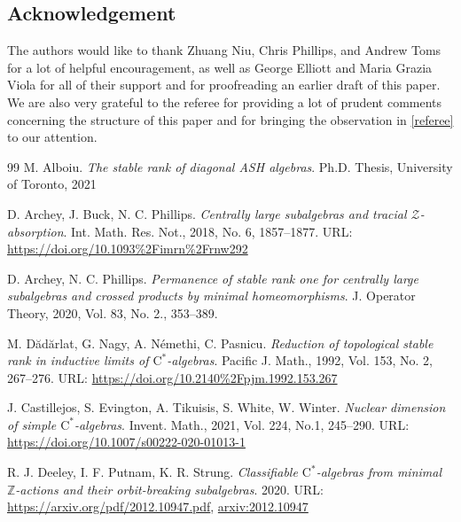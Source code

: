 \documentclass[12pt]{amsart}
\numberwithin{equation}{section}
\theoremstyle{definition}
\theoremstyle{remark}
\begin{document}
\subsection*{Acknowledgement}
The authors would like to thank Zhuang Niu, Chris Phillips, and Andrew Toms for a lot of helpful encouragement, as well as George Elliott and Maria Grazia Viola for all of their support and for proofreading an earlier draft of this paper. We are also very grateful to the referee for providing a lot of prudent comments concerning the structure of this paper and for bringing the observation in \autoref{referee} to our attention.



\begin{thebibliography}{99} 
 M. Alboiu. \textit{The stable rank of diagonal ASH algebras}. Ph.D. Thesis, University of Toronto, 2021

 D. Archey, J. Buck, N. C. Phillips. \textit{Centrally large subalgebras and tracial $\mathcal{Z}$-absorption}. Int. Math. Res. Not., 2018, No. 6, 1857--1877. URL: \href{https://doi.org/10.1093\%2Fimrn\%2Frnw292}{https://doi.org/10.1093\%2Fimrn\%2Frnw292}
	
 D. Archey, N. C. Phillips. \textit{Permanence of stable rank one for centrally large subalgebras and crossed products by minimal homeomorphisms}. J. Operator Theory, 2020, Vol. 83, No. 2., 353--389.%
	
 M. D\u{a}d\u{a}rlat, G. Nagy, A. N\'{e}methi, C. Pasnicu. \textit{Reduction of topological stable rank in inductive limits of $\mathrm{C}^*$-algebras}. Pacific J. Math., 1992, Vol. 153, No. 2, 267--276. URL: \href{https://doi.org/10.2140\%2Fpjm.1992.153.267}{https://doi.org/10.2140\%2Fpjm.1992.153.267}

 J. Castillejos, S. Evington, A. Tikuisis, S. White, W. Winter. \textit{Nuclear dimension of simple $\mathrm{C}^{*}$-algebras}. Invent. Math., 2021, Vol. 224, No.1, 245--290. URL: \href{https://doi.org/10.1007/s00222-020-01013-1}{https://doi.org/10.1007/s00222-020-01013-1}

 R. J. Deeley, I. F. Putnam, K. R. Strung. \textit{Classifiable $\mathrm{C}^{*}$-algebras from minimal $\mathbb{Z}$-actions and their orbit-breaking subalgebras}. 2020. URL: \href{https://arxiv.org/pdf/2012.10947.pdf}{https://arxiv.org/pdf/2012.10947.pdf}, \href{https://arxiv.org/abs/2012.10947}{arxiv:2012.10947}	


\end{thebibliography}
\end{document}
